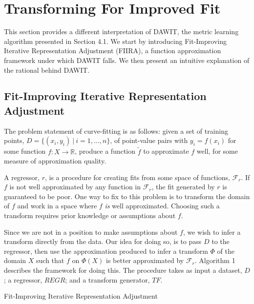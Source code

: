 \section{Transforming For Improved Fit}
This section provides a different interpretation of DAWIT, the metric learning
algorithm presented in Section 4.1.
We start by introducing Fit-Improving Iterative Representation Adjustment
(FIIRA), a function approximation framework under which DAWIT falls.
We then present an intuitive explanation of the rational behind DAWIT.

\subsection{Fit-Improving Iterative Representation Adjustment}
The problem statement of curve-fitting is as follows: given a set of training
points, $D = \{(x_i,y_i)\ |\ i = 1, \ldots, n\}$, of point-value pairs with
$y_i = f(x_i)$ for some function $f : X \to \mathbb{R}$,
produce a function $\tilde f$ to approximate $f$ well, for some measure of
approximation quality.

A regressor, $r$, is a procedure for creating fits from some space of
functions, $\mathcal{F}_r$.
If $f$ is not well approximated by any function in $\mathcal{F}_r$,
the fit generated by $r$ is guaranteed to be poor.
One way to fix to this problem is to transform the domain of $f$ and work in a
space where $f$ \textit{is} well approximated. Choosing such a transform
requires prior knowledge or assumptions about $f$.

Since we are not in a position to make assumptions about $f$,
we wish to infer a transform directly from the data.
Our idea for doing so, is to pass $D$ to the regressor,
then use the approximation produced to infer a transform $\Phi$ of the
domain $X$ such that $f$ on $\Phi(X)$ is better approximated by $\mathcal{F}_r$.
Algorithm 1 describes the framework for doing this.
The procedure takes as input a dataset, $D$; a regressor, $REGR$;
and a transform generator, $TF$.

\begin{algorithm}
\caption{Fit-Improving Iterative Representation Adjustment}\label{FIIRA}
\end{algorithm}

